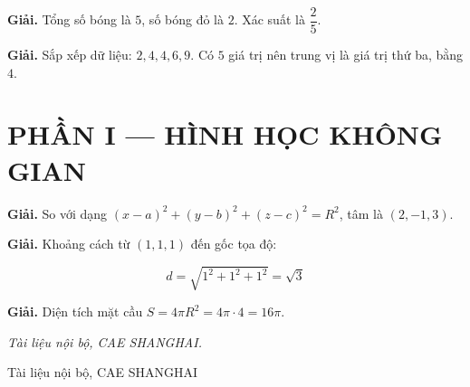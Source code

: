 \documentclass[11pt, a4paper]{article}
\begin{document}
\vspace{0.3cm}
\begin{dapan}[44 — Đáp án A]

\textbf{Giải.} Tổng số bóng là $5$, số bóng đỏ là $2$. Xác suất là $\dfrac{2}{5}$.


\end{dapan}
\vspace{0.3cm}
\begin{dapan}[45 — Đáp án D]

\textbf{Giải.} Sắp xếp dữ liệu: $2, 4, 4, 6, 9$. Có $5$ giá trị nên trung vị là giá trị thứ ba, bằng $4$.

\section{PHẦN I — HÌNH HỌC KHÔNG GIAN}


\end{dapan}
\vspace{0.3cm}
\begin{dapan}[46 — Đáp án B]

\textbf{Giải.} So với dạng $(x-a)^2 + (y-b)^2 + (z-c)^2 = R^2$, tâm là $(2, -1, 3)$.


\end{dapan}
\vspace{0.3cm}
\begin{dapan}[47 — Đáp án C]

\textbf{Giải.} Khoảng cách từ $(1, 1, 1)$ đến gốc tọa độ:

$$d = \sqrt{1^2 + 1^2 + 1^2} = \sqrt{3}$$


\end{dapan}
\vspace{0.3cm}
\begin{dapan}[48 — Đáp án D]

\textbf{Giải.} Diện tích mặt cầu $S = 4\pi R^2 = 4\pi \cdot 4 = 16\pi$.

\emph{Tài liệu nội bộ, CAE SHANGHAI.}
\end{dapan}
\vspace{0.3cm}

\vspace{0.8cm}
\begin{center}
{\footnotesize\color{cae_blue} Tài liệu nội bộ, CAE SHANGHAI}
\end{center}
\end{document}
